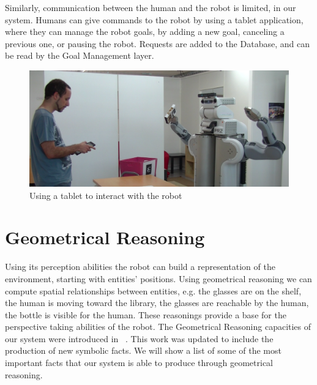 Similarly, communication between the human and the robot is limited, in our system. Humans can give commands to the robot by using a tablet application, where they can manage the robot goals, by adding a new goal, canceling a previous one, or pausing the robot. Requests are added to the Database, and can be read by the Goal Management layer. 

 \begin{figure}[ht!]
	\centering
	\includegraphics[scale=0.2]{img/situation_assessment/tablet.pdf}
	\caption{Using a tablet to interact with the robot}
	\label{fig:situation_assessment-explore}
\end{figure}

\section{Geometrical Reasoning}
Using its perception abilities the robot can build a representation of the environment, starting with entities' positions. Using geometrical reasoning we can compute spatial relationships between entities, e.g. the glasses are on the shelf, the human is moving toward the library, the glasses are reachable by the human, the bottle is visible for the human. These reasonings provide a base for the perspective taking abilities of the robot.  The Geometrical Reasoning capacities of our system were introduced in ~\cite{Sisbot2011}. This work was updated to include the production of new symbolic facts. We will show a list of some of the most important facts that our system is able to produce through geometrical reasoning.

